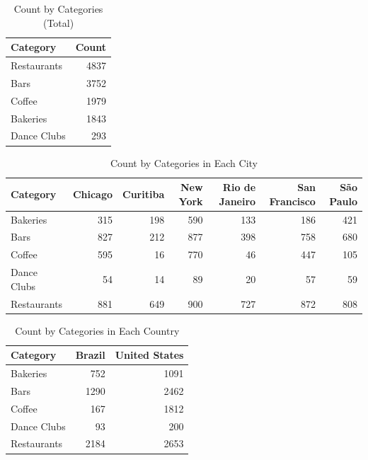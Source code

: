 \documentclass{ieeeaccess}
\begin{document}
\begin{table}[h!]
\centering
\caption{Count by Categories (Total)}
\label{tab:count_by_categories_total}
\begin{tabular}{|l|r|}
\hline
\textbf{Category}  & \textbf{Count} \\
\hline
Restaurants & 4837 \\
Bars        & 3752 \\
Coffee      & 1979 \\
Bakeries    & 1843 \\
Dance Clubs &  293 \\
\hline
\end{tabular}
\end{table}

\begin{table}[h!]
\centering
\caption{Count by Categories in Each City}
\label{tab:count_by_categories_city}
\begin{tabular}{|l|r|r|r|r|r|r|}
\hline
\textbf{Category} & \textbf{Chicago} & \textbf{Curitiba} & \textbf{New York} & \textbf{Rio de Janeiro} & \textbf{San Francisco} & \textbf{São Paulo} \\
\hline
Bakeries    &  315 &  198 &  590 &  133 &  186 &  421 \\
Bars        &  827 &  212 &  877 &  398 &  758 &  680 \\
Coffee      &  595 &   16 &  770 &   46 &  447 &  105 \\
Dance Clubs &   54 &   14 &   89 &   20 &   57 &   59 \\
Restaurants &  881 &  649 &  900 &  727 &  872 &  808 \\
\hline
\end{tabular}
\end{table}

\begin{table}[h!]
\centering
\caption{Count by Categories in Each Country}
\label{tab:count_by_categories_country}
\begin{tabular}{|l|r|r|}
\hline
\textbf{Category} & \textbf{Brazil} & \textbf{United States} \\
\hline
Bakeries    &  752 & 1091 \\
Bars        & 1290 & 2462 \\
Coffee      &  167 & 1812 \\
Dance Clubs &   93 &  200 \\
Restaurants & 2184 & 2653 \\
\hline
\end{tabular}
\end{table}
    
\end{document}
